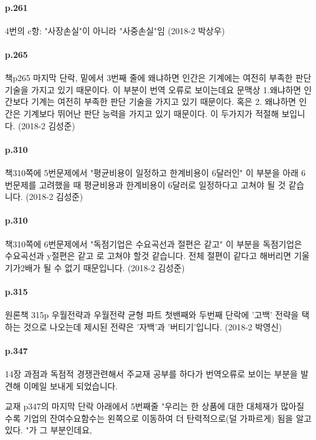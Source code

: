 \documentclass[a4paper]{article}
\begin{document}
\paragraph{p.261} %
\label{par:p_261}
4번의 c항: "사장손실"이 아니라 "사중손실"임 (2018-2 박상우)
\paragraph{p.265} %
\label{par:p_265}
책p265 마지막 단락, 밑에서 3번째 줄에 왜냐하면 인간은 기계에는 여전히 부족한 판단 기술을 가지고 있기 때문이다. 
이 부분이 번역 오류로 보이는데요
 문맥상 
1.왜냐하면 인간보다 기계는 여전히 부족한 판단 기술을 가지고 있기 때문이다.  
혹은 
2. 왜냐하면 인간은 기계보다 뛰어난 판단 능력을 가지고 있기 때문이다.
이 두가지가 적절해 보입니다.  (2018-2 김성준)

\paragraph{p.310} %
\label{par:p_310}
책310쪽에 5번문제에서 "평균비용이 일정하고 한계비용이 6달러인" 이 부분을 아래 6번문제를 고려했을 때 평균비용과 한계비용이 6달러로 일정하다고 고쳐야 될 것 같습니다. (2018-2 김성준)

\paragraph{p.310} %
\label{par:p_310}
책310쪽에 6번문제에서 "독점기업은 수요곡선과 절편은 같고" 이 부분을 독점기업은 수요곡선과 y절편은 같고 로 고쳐야 할것 같습니다.
전체 절편이 같다고 해버리면 기울기가2배가 될 수 없기 때문입니다. (2018-2 김성준)

\paragraph{p.315} %
\label{par:p_315}
원론책 315p 우월전략과 우월전략 균형 파트 첫밴째와 두번째 단락에 '고백' 전략을 택하는 것으로 나오는데 제시된 전략은 '자백'과 '버티기'입니다. (2018-2 박영신)
\paragraph{p.347} %
\label{par:p_347}
14장 과점과 독점적 경쟁관련해서 주교재 공부를 하다가 번역오류로 보이는 부분을 발견해 이메일 보내게 되었습니다. 

교재 p347의 마지막 단락 아래에서 5번째줄 "우리는 한 상품에 대한 대체재가 많아질수록 기업의 잔여수요함수는 왼쪽으로 이동하여 더 탄력적으로(덜 가파르게) 됨을 알고있다. "가 그 부분인데요,
\end{document}
